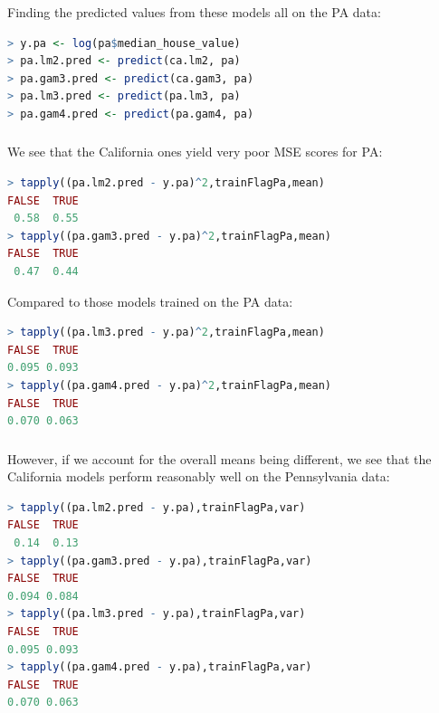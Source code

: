 \documentclass[xetex,mathserif,serif,aspectratio=169]{beamer}
\begin{document}
\begin{frame}[fragile] \frametitle{} \oldB \small

Finding the predicted values from these models all on the PA data:
\begin{lstlisting}[language=R, basicstyle=\ttfamily]
> y.pa <- log(pa$median_house_value)
> pa.lm2.pred <- predict(ca.lm2, pa)
> pa.gam3.pred <- predict(ca.gam3, pa)
> pa.lm3.pred <- predict(pa.lm3, pa)
> pa.gam4.pred <- predict(pa.gam4, pa)
\end{lstlisting}

\end{frame}


\begin{frame}[fragile] \frametitle{} \oldB \small

We see that the California ones yield very poor MSE scores
for PA:
\begin{lstlisting}[language=R, basicstyle=\ttfamily]
> tapply((pa.lm2.pred - y.pa)^2,trainFlagPa,mean)
FALSE  TRUE
 0.58  0.55
> tapply((pa.gam3.pred - y.pa)^2,trainFlagPa,mean)
FALSE  TRUE
 0.47  0.44
\end{lstlisting}
Compared to those models trained on the PA data:
\begin{lstlisting}[language=R, basicstyle=\ttfamily]
> tapply((pa.lm3.pred - y.pa)^2,trainFlagPa,mean)
FALSE  TRUE
0.095 0.093
> tapply((pa.gam4.pred - y.pa)^2,trainFlagPa,mean)
FALSE  TRUE
0.070 0.063
\end{lstlisting}

\end{frame}

\begin{frame}[fragile] \frametitle{} \oldB \small

However, if we account for the overall means being different, we
see that the California models perform reasonably well on
the Pennsylvania data:
\begin{lstlisting}[language=R, basicstyle=\ttfamily]
> tapply((pa.lm2.pred - y.pa),trainFlagPa,var)
FALSE  TRUE
 0.14  0.13
> tapply((pa.gam3.pred - y.pa),trainFlagPa,var)
FALSE  TRUE
0.094 0.084
> tapply((pa.lm3.pred - y.pa),trainFlagPa,var)
FALSE  TRUE
0.095 0.093
> tapply((pa.gam4.pred - y.pa),trainFlagPa,var)
FALSE  TRUE
0.070 0.063
\end{lstlisting}

\end{frame}
\end{document}
